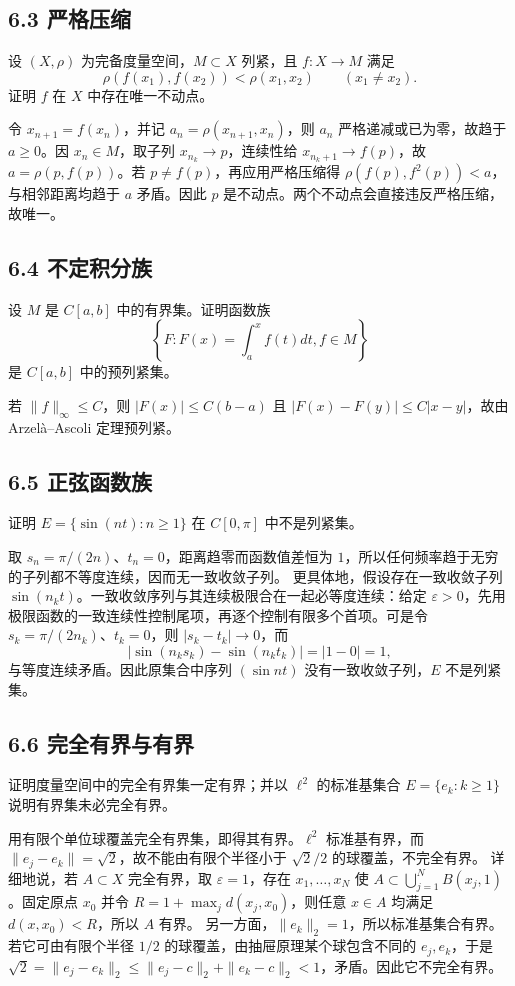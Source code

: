 \subsection*{6.3 严格压缩}
\begin{problem}
设 $(X,\rho)$ 为完备度量空间，$M\subset X$ 列紧，且 $f:X\to M$ 满足
\[
\rho(f(x_1),f(x_2))<\rho(x_1,x_2)\qquad(x_1\ne x_2).
\]
证明 $f$ 在 $X$ 中存在唯一不动点。
\end{problem}
令 $x_{n+1}=f(x_n)$，并记 $a_n=\rho(x_{n+1},x_n)$，则 $a_n$ 严格递减或已为零，故趋于 $a\ge0$。因 $x_n\in M$，取子列 $x_{n_k}\to p$，连续性给 $x_{n_k+1}\to f(p)$，故 $a=\rho(p,f(p))$。若 $p\ne f(p)$，再应用严格压缩得
$\rho(f(p),f^2(p))<a$，与相邻距离均趋于 $a$ 矛盾。因此 $p$ 是不动点。两个不动点会直接违反严格压缩，故唯一。

\subsection*{6.4 不定积分族}
\begin{problem}
设 $M$ 是 $C[a,b]$ 中的有界集。证明函数族
\[
\left\{F:F(x)=\int_a^xf(t)dt, f\in M\right\}
\]
是 $C[a,b]$ 中的预列紧集。
\end{problem}
若 $\|f\|_\infty\le C$，则 $|F(x)|\le C(b-a)$ 且
$|F(x)-F(y)|\le C|x-y|$，故由 Arzelà--Ascoli 定理预列紧。

\subsection*{6.5 正弦函数族}
\begin{problem}
证明 $E=\{\sin(nt):n\ge1\}$ 在 $C[0,\pi]$ 中不是列紧集。
\end{problem}
取 $s_n=\pi/(2n)$、$t_n=0$，距离趋零而函数值差恒为 $1$，所以任何频率趋于无穷的子列都不等度连续，因而无一致收敛子列。
更具体地，假设存在一致收敛子列 $\sin(n_kt)$。一致收敛序列与其连续极限合在一起必等度连续：给定 $\varepsilon>0$，先用极限函数的一致连续性控制尾项，再逐个控制有限多个首项。可是令
$s_k=\pi/(2n_k)$、$t_k=0$，则 $|s_k-t_k|\to0$，而
\[
|\sin(n_ks_k)-\sin(n_kt_k)|=|1-0|=1,
\]
与等度连续矛盾。因此原集合中序列 $(\sin nt)$ 没有一致收敛子列，$E$ 不是列紧集。

\subsection*{6.6 完全有界与有界}
\begin{problem}
证明度量空间中的完全有界集一定有界；并以 $\ell^2$ 的标准基集合
$E=\{e_k:k\ge1\}$ 说明有界集未必完全有界。
\end{problem}
用有限个单位球覆盖完全有界集，即得其有界。$\ell^2$ 标准基有界，而
$\|e_j-e_k\|=\sqrt2$，故不能由有限个半径小于 $\sqrt2/2$ 的球覆盖，不完全有界。
详细地说，若 $A\subset X$ 完全有界，取 $\varepsilon=1$，存在 $x_1,\ldots,x_N$ 使
$A\subset\bigcup_{j=1}^NB(x_j,1)$。固定原点 $x_0$ 并令
$R=1+\max_jd(x_j,x_0)$，则任意 $x\in A$ 均满足 $d(x,x_0)<R$，所以 $A$ 有界。
另一方面，$\|e_k\|_2=1$，所以标准基集合有界。若它可由有限个半径 $1/2$ 的球覆盖，由抽屉原理某个球包含不同的 $e_j,e_k$，于是
$\sqrt2=\|e_j-e_k\|_2\le\|e_j-c\|_2+\|e_k-c\|_2<1$，矛盾。因此它不完全有界。

